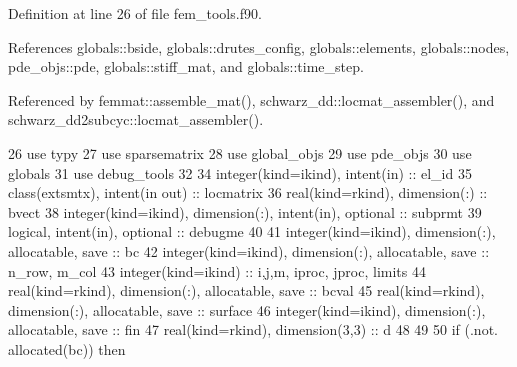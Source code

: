 Definition at line 26 of file fem\+\_\+tools.\+f90.



References globals\+::bside, globals\+::drutes\+\_\+config, globals\+::elements, globals\+::nodes, pde\+\_\+objs\+::pde, globals\+::stiff\+\_\+mat, and globals\+::time\+\_\+step.



Referenced by femmat\+::assemble\+\_\+mat(), schwarz\+\_\+dd\+::locmat\+\_\+assembler(), and schwarz\+\_\+dd2subcyc\+::locmat\+\_\+assembler().


\begin{DoxyCode}
26     \textcolor{keywordtype}{use }typy
27     \textcolor{keywordtype}{use }sparsematrix
28     \textcolor{keywordtype}{use }global_objs
29     \textcolor{keywordtype}{use }pde_objs
30     \textcolor{keywordtype}{use }globals
31     \textcolor{keywordtype}{use }debug_tools
32     
34     \textcolor{keywordtype}{integer(kind=ikind)}, \textcolor{keywordtype}{intent(in)} :: el\_id
35     \textcolor{keywordtype}{class}(extsmtx), \textcolor{keywordtype}{intent(in out)}  :: locmatrix
36     \textcolor{keywordtype}{real(kind=rkind)}, \textcolor{keywordtype}{dimension(:)} :: bvect
38     \textcolor{keywordtype}{integer(kind=ikind)}, \textcolor{keywordtype}{dimension(:)}, \textcolor{keywordtype}{intent(in)}, \textcolor{keywordtype}{optional} :: subprmt
39     \textcolor{keywordtype}{logical}, \textcolor{keywordtype}{intent(in)}, \textcolor{keywordtype}{optional} :: debugme
40     
41     \textcolor{keywordtype}{integer(kind=ikind)}, \textcolor{keywordtype}{dimension(:)}, \textcolor{keywordtype}{allocatable}, \textcolor{keywordtype}{save} :: bc
42     \textcolor{keywordtype}{integer(kind=ikind)}, \textcolor{keywordtype}{dimension(:)}, \textcolor{keywordtype}{allocatable}, \textcolor{keywordtype}{save} :: n\_row, m\_col
43     \textcolor{keywordtype}{integer(kind=ikind)} :: i,j,m, iproc, jproc, limits
44     \textcolor{keywordtype}{real(kind=rkind)}, \textcolor{keywordtype}{dimension(:)}, \textcolor{keywordtype}{allocatable}, \textcolor{keywordtype}{save} :: bcval
45     \textcolor{keywordtype}{real(kind=rkind)}, \textcolor{keywordtype}{dimension(:)}, \textcolor{keywordtype}{allocatable}, \textcolor{keywordtype}{save} :: surface
46     \textcolor{keywordtype}{integer(kind=ikind)}, \textcolor{keywordtype}{dimension(:)}, \textcolor{keywordtype}{allocatable}, \textcolor{keywordtype}{save} :: fin
47     \textcolor{keywordtype}{real(kind=rkind)}, \textcolor{keywordtype}{dimension(3,3)} :: d
48    
49 
50     \textcolor{keywordflow}{if} (.not. \textcolor{keyword}{allocated}(bc)) \textcolor{keywordflow}{then}       

\end{DoxyCode}
